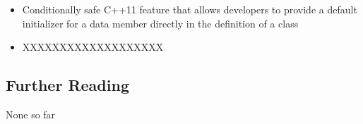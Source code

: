 \begin{itemize}
\item{Conditionally safe C++11 feature that allows developers to provide a default initializer for a data member directly in the definition of a class}
\item{XXXXXXXXXXXXXXXXXXX}
\end{itemize}

\subsection[Further Reading]{Further Reading}\label{further-reading}

None so far

